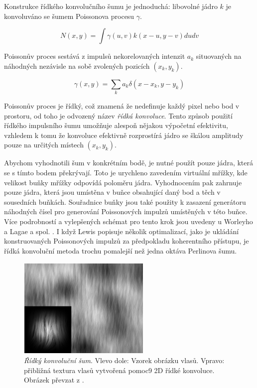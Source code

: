 Konstrukce řídkého konvolučního šumu je jednoduchá: libovolné jádro $k$ je konvoluváno se šumem Poissonova procesu $\gamma$.

\[N(x,y) = \int\gamma(u,v)k(x-u,y-v)dudv\]

Poissonův proces sestává z impulsů nekorelovaných intenzit $a_k$ situovaných na náhodných nezávisle na sobě zvolených pozicích $(x_k,y_k)$.

\[\gamma(x,y) = \sum_k a_k \delta(x-x_k,y-y_k)\]

Poissonův proces je řídký, což znamená že nedefinuje každý pixel nebo bod v prostoru, od toho je odvozený název \textit{řídká konvoluce}. Tento způsob použití řídkého impulsního šumu umožňuje alespoň nějakou výpočetní efektivitu, vzhledem k tomu že konvoluce efektivně rozprostírá jádro se škálou amplitudy pouze na určitých místech $(x_k, y_k)$.

Abychom vyhodnotili šum v konkrétním bodě, je nutné použít pouze jádra, která se s tímto bodem překrývají. Toto je urychleno zavedením virtuální mřížky, kde velikost buňky mřížky odpovídá poloměru jádra. Vyhodnocením pak zahrnuje pouze jádra, která jsou umístěna v buňce obsahující daný bod a těch v sousedních buňkách. Souřadnice buňky jsou také použity k zasazení generátoru náhodných čísel pro generování Poissonových impulzů umístěných v této buňce. Více podrobností a vylepšených schémat pro tento krok jsou uvedeny u Worleyho \cite{worley1996} a Lagae a spol. \cite{Lagae09}. I když Lewis \cite{Lewis89} popisuje několik optimalizací, jako je ukládání konstruovaných Poissonových impulzů za předpokladu koherentního přístupu, je řídká konvoluční metoda trochu pomalejší než jedna oktáva Perlinova šumu.

\begin{figure}[H]
	\centering
	\includegraphics[scale=1]{obrazky-figures/SparseConvolutionNoise.png}
	\caption{\textit{Řídký konvoluční šum}. Vlevo dole: Vzorek obrázku vlasů. Vpravo: přibližná textura vlasů vytvořená pomoc9 2D řídké konvoluce. Obrázek převzat z \cite{Lagae10}.}
	\label{fig:SparseConvolutionNoise}
\end{figure}

